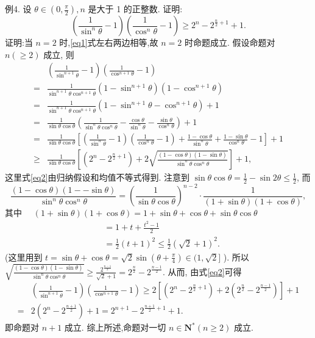 例4. 设 $\theta \in\left(0, \frac{\pi}{2}\right), n$ 是大于 1 的正整数.
证明:
$$
\left(\frac{1}{\sin ^n \theta}-1\right)\left(\frac{1}{\cos ^n \theta}-1\right) \geqslant 2^n-2^{\frac{n}{2}+1}+1 . \label{eq1}
$$
证明:当 $n=2$ 时,\ref{eq1}式左右两边相等,故 $n=2$ 时命题成立.
假设命题对 $n(\geqslant 2)$ 成立, 则
$$
\begin{aligned}
& \left(\frac{1}{\sin ^{n+1} \theta}-1\right)\left(\frac{1}{\cos ^{n+1} \theta}-1\right) \\
= & \frac{1}{\sin ^{n+1} \theta \cos ^{n+1} \theta}\left(1-\sin ^{n+1} \theta\right)\left(1-\cos ^{n+1} \theta\right) \\
= & \frac{1}{\sin ^{n+1} \theta \cos ^{n+1} \theta}\left(1-\sin ^{n+1} \theta-\cos ^{n+1} \theta\right)+1 \\
= & \frac{1}{\sin \theta \cos \theta}\left(\frac{1}{\sin ^n \theta \cos ^n \theta}-\frac{\cos \theta}{\sin ^n \theta}-\frac{\sin \theta}{\cos ^n \theta}\right)+1 \\
= & \frac{1}{\sin \theta \cos \theta}\left[\left(\frac{1}{\sin ^n \theta}-1\right)\left(\frac{1}{\cos ^n \theta}-1\right)+\frac{1-\cos \theta}{\sin ^n \theta}+\frac{1-\sin \theta}{\cos ^n \theta}-1\right]+1 \\
\geqslant & \frac{1}{\sin \theta \cos \theta}\left[\left(2^n-2^{\frac{n}{2}+1}\right)+2 \sqrt{\frac{(1-\cos \theta)(1-\sin \theta)}{\sin ^n \theta \cos ^n \theta}}\right]+1,
\end{aligned} \label{eq2}
$$
这里式\ref{eq2}由归纳假设和均值不等式得到.
注意到 $\sin \theta \cos \theta=\frac{1}{2}-\sin 2 \theta \leqslant \frac{1}{2}$, 而
$$
\frac{(1-\cos \theta)(1--\sin \theta)}{\sin ^n \theta \cos ^n \theta}=\left(\frac{1}{\sin \theta \cos \theta}\right)^{n-2} \cdot \frac{1}{(1+\sin \theta)(1+\cos \theta)},
$$
其中 $\quad(1+\sin \theta)(1+\cos \theta)=1+\sin \theta+\cos \theta+\sin \theta \cos \theta$
$$
\begin{aligned}
& =1+t+\frac{t^2-1}{2} \\
& =\frac{1}{2}(t+1)^2 \leqslant \frac{1}{2}(\sqrt{2}+1)^2 .
\end{aligned}
$$
(这里用到 $t=\sin \theta+\cos \theta=\sqrt{2} \sin \left(\theta+\frac{\pi}{4}\right) \in(1, \sqrt{2}]$ ).
所以 $\sqrt{\frac{(1-\cos \theta)(1-\sin \theta)}{\sin ^n \theta \cos ^n \theta}} \geqslant \frac{2^{\frac{n-1}{2}}}{\sqrt{2}+1}=2^{\frac{n}{2}}-2^{\frac{n-1}{2}}$. 从而, 由式\ref{eq2}可得
$$
\begin{aligned}
& \left(\frac{1}{\sin ^{n+1} \theta}-1\right)\left(\frac{1}{\cos ^{n+1} \theta}-1\right) \geqslant 2\left[\left(2^n-2^{\frac{n}{2}+1}\right)+2\left(2^{\frac{n}{2}}-2^{\frac{n-1}{2}}\right)\right]+1 \\
= & 2\left(2^n-2^{\frac{n+1}{2}}\right)+1=2^{n+1}-2^{\frac{n+1}{2}+1}+1 .
\end{aligned}
$$
即命题对 $n+1$ 成立.
综上所述,命题对一切 $n \in \mathbf{N}^*(n \geqslant 2)$ 成立.




